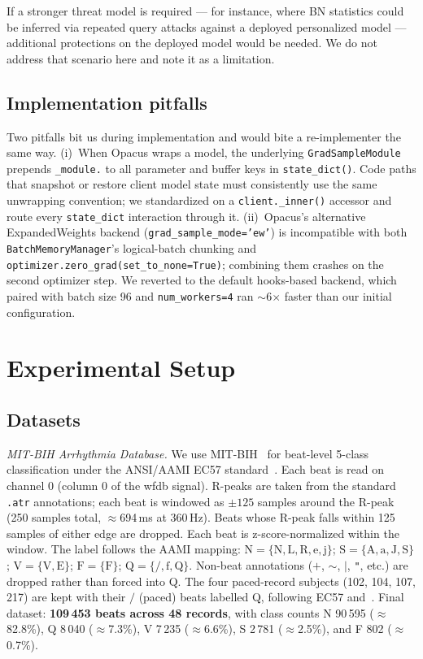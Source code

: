 \documentclass[conference]{IEEEtran}
\newcommand{\code}[1]{\texttt{\small #1}}
\begin{document}
If a stronger threat model is required --- for instance, where BN statistics could be inferred via repeated query attacks against a deployed personalized model --- additional protections on the deployed model would be needed. We do not address that scenario here and note it as a limitation.

\subsection{Implementation pitfalls}
Two pitfalls bit us during implementation and would bite a re-implementer the same way. (i)~When Opacus wraps a model, the underlying \code{GradSampleModule} prepends \code{\_module.} to all parameter and buffer keys in \code{state\_dict()}. Code paths that snapshot or restore client model state must consistently use the same unwrapping convention; we standardized on a \code{client.\_inner()} accessor and route every \code{state\_dict} interaction through it. (ii)~Opacus's alternative ExpandedWeights backend (\code{grad\_sample\_mode='ew'}) is incompatible with both \code{BatchMemoryManager}'s logical-batch chunking and \code{optimizer.zero\_grad(set\_to\_none=True)}; combining them crashes on the second optimizer step. We reverted to the default hooks-based backend, which paired with batch size 96 and \code{num\_workers=4} ran $\sim$6$\times$ faster than our initial configuration.

\section{Experimental Setup}\label{sec:setup}

\subsection{Datasets}
\emph{MIT-BIH Arrhythmia Database.} We use MIT-BIH~\cite{mitbih} for beat-level 5-class classification under the ANSI/AAMI EC57 standard~\cite{ec57,dechazal,mondejar}. Each beat is read on channel 0 (column 0 of the wfdb signal). R-peaks are taken from the standard \code{.atr} annotations; each beat is windowed as $\pm125$ samples around the R-peak (250 samples total, $\approx$694\,ms at 360\,Hz). Beats whose R-peak falls within 125 samples of either edge are dropped. Each beat is z-score-normalized within the window. The label follows the AAMI mapping: $\mathrm{N} = \{\mathrm{N,L,R,e,j}\}$; $\mathrm{S} = \{\mathrm{A,a,J,S}\}$; $\mathrm{V} = \{\mathrm{V,E}\}$; $\mathrm{F} = \{\mathrm{F}\}$; $\mathrm{Q} = \{/, \mathrm{f, Q}\}$. Non-beat annotations ($+$, $\sim$, $|$, \texttt{"}, etc.) are dropped rather than forced into Q. The four paced-record subjects (102, 104, 107, 217) are kept with their $/$ (paced) beats labelled Q, following EC57 and~\cite{dechazal}. Final dataset: \textbf{109\,453 beats across 48 records}, with class counts N 90\,595 ($\approx$82.8\%), Q 8\,040 ($\approx$7.3\%), V 7\,235 ($\approx$6.6\%), S 2\,781 ($\approx$2.5\%), and F 802 ($\approx$0.7\%).
\end{document}
